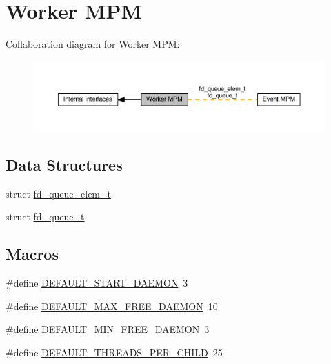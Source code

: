 \hypertarget{group__APACHE__MPM__WORKER}{}\section{Worker M\+PM}
\label{group__APACHE__MPM__WORKER}
Collaboration diagram for Worker M\+PM\+:
\nopagebreak
\begin{figure}[H]
\begin{center}
\leavevmode
\includegraphics[width=350pt]{group__APACHE__MPM__WORKER}
\end{center}
\end{figure}
\subsection*{Data Structures}
\begin{DoxyCompactItemize}
\item 
struct \hyperlink{structfd__queue__elem__t}{fd\+\_\+queue\+\_\+elem\+\_\+t}
\item 
struct \hyperlink{structfd__queue__t}{fd\+\_\+queue\+\_\+t}
\end{DoxyCompactItemize}
\subsection*{Macros}
\begin{DoxyCompactItemize}
\item 
\#define \hyperlink{group__APACHE__MPM__WORKER_gac3950e57f9e8a7cfe6ff3fa67237e604}{D\+E\+F\+A\+U\+L\+T\+\_\+\+S\+T\+A\+R\+T\+\_\+\+D\+A\+E\+M\+ON}~3
\item 
\#define \hyperlink{group__APACHE__MPM__WORKER_ga77abf0320697e196e2d1d282cca9ad44}{D\+E\+F\+A\+U\+L\+T\+\_\+\+M\+A\+X\+\_\+\+F\+R\+E\+E\+\_\+\+D\+A\+E\+M\+ON}~10
\item 
\#define \hyperlink{group__APACHE__MPM__WORKER_gabfe5932653591d3339a6620cbd0d40be}{D\+E\+F\+A\+U\+L\+T\+\_\+\+M\+I\+N\+\_\+\+F\+R\+E\+E\+\_\+\+D\+A\+E\+M\+ON}~3
\item 
\#define \hyperlink{group__APACHE__MPM__WORKER_gaf3e2d0fe4c45aac538a61bf99d69a378}{D\+E\+F\+A\+U\+L\+T\+\_\+\+T\+H\+R\+E\+A\+D\+S\+\_\+\+P\+E\+R\+\_\+\+C\+H\+I\+LD}~25
\end{DoxyCompactItemize}
